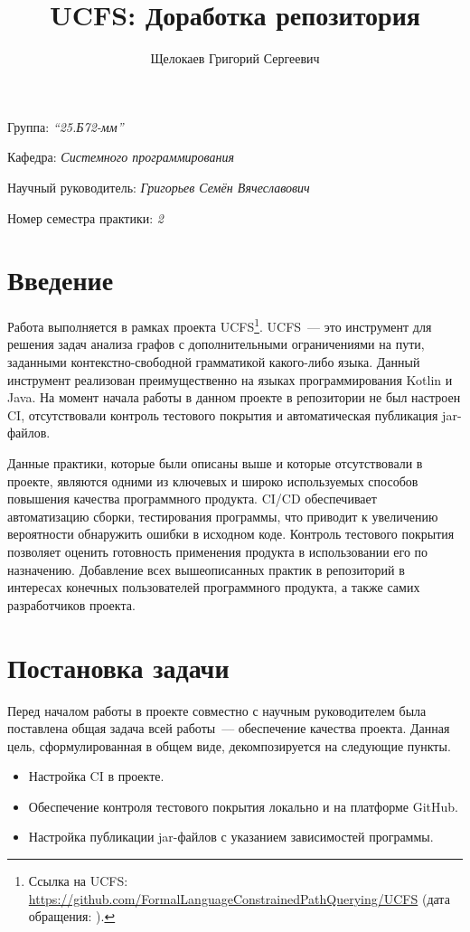 \documentclass[a4paper]{article}
\title{UCFS: Доработка репозитория}
\author{Щелокаев Григорий Сергеевич}
\date{}
\begin{document}
\maketitle

\begin{flushright}
    Группа: \emph{\enquote{25.Б72-мм}}

    Кафедра: \emph{Системного программирования}

    Научный руководитель: \emph{Григорьев Семён Вячеславович}

    Номер семестра практики: \emph{2}
\end{flushright} 


\section{Введение}

Работа выполняется в рамках проекта UCFS\footnote{Ссылка на UCFS: \url{https://github.com/FormalLanguageConstrainedPathQuerying/UCFS} (дата обращения: ).}. UCFS~--- это инструмент для решения задач анализа графов с дополнительными ограничениями на пути, заданными контекстно-свободной грамматикой какого-либо языка. Данный инструмент реализован преимущественно на языках программирования Kotlin и Java.
На момент начала работы в данном проекте в репозитории не был настроен CI, отсутствовали контроль тестового покрытия и автоматическая публикация jar-файлов.

Данные практики, которые были описаны выше и которые отсутствовали в проекте, являются одними из ключевых и широко используемых способов повышения качества программного продукта. CI/CD обеспечивает автоматизацию сборки, тестирования программы, что приводит к увеличению вероятности обнаружить ошибки в исходном коде. Контроль тестового покрытия позволяет оценить готовность применения продукта в использовании его по назначению. Добавление всех вышеописанных практик в репозиторий в интересах конечных пользователей программного продукта, а также самих разработчиков проекта.

\section{Постановка задачи}

Перед началом работы в проекте совместно с научным руководителем была поставлена общая задача всей работы~--- обеспечение качества проекта. Данная цель, сформулированная в общем виде, декомпозируется на следующие пункты.
\begin{itemize}
    \item Настройка CI в проекте.
    \item Обеспечение контроля тестового покрытия локально и на платформе GitHub.
    \item Настройка публикации jar-файлов с указанием зависимостей программы.
\end{itemize}
\end{document}

